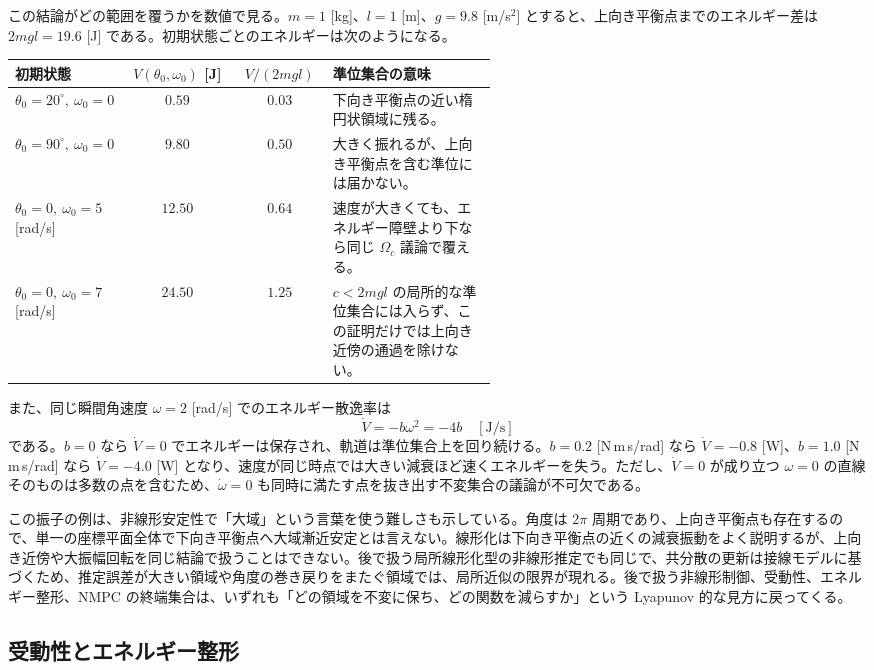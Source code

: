 \begin{example}[粘性減衰をもつ単振子]
この結論がどの範囲を覆うかを数値で見る。$m=1$ [kg]、$l=1$ [m]、$g=9.8$ [m/s$^2$] とすると、上向き平衡点までのエネルギー差は $2mgl=19.6$ [J] である。初期状態ごとのエネルギーは次のようになる。
\begin{center}
\begin{tabular}{p{0.22\linewidth}|c|c|p{0.34\linewidth}}
初期状態 & $V(\theta_0,\omega_0)$ [J] & $V/(2mgl)$ & 準位集合の意味\\ \hline
$\theta_0=20^\circ,\ \omega_0=0$ & $0.59$ & $0.03$ & 下向き平衡点の近い楕円状領域に残る。\\
$\theta_0=90^\circ,\ \omega_0=0$ & $9.80$ & $0.50$ & 大きく振れるが、上向き平衡点を含む準位には届かない。\\
$\theta_0=0,\ \omega_0=5$ [rad/s] & $12.50$ & $0.64$ & 速度が大きくても、エネルギー障壁より下なら同じ $\Omega_c$ 議論で覆える。\\
$\theta_0=0,\ \omega_0=7$ [rad/s] & $24.50$ & $1.25$ & $c<2mgl$ の局所的な準位集合には入らず、この証明だけでは上向き近傍の通過を除けない。\\
\end{tabular}
\end{center}
また、同じ瞬間角速度 $\omega=2$ [rad/s] でのエネルギー散逸率は
\begin{equation}
  \dot{V}=-b\omega^2=-4b\quad[\mathrm{J/s}]
\end{equation}
である。$b=0$ なら $\dot{V}=0$ でエネルギーは保存され、軌道は準位集合上を回り続ける。$b=0.2$ [N\,m\,s/rad] なら $\dot{V}=-0.8$ [W]、$b=1.0$ [N\,m\,s/rad] なら $\dot{V}=-4.0$ [W] となり、速度が同じ時点では大きい減衰ほど速くエネルギーを失う。ただし、$\dot{V}=0$ が成り立つ $\omega=0$ の直線そのものは多数の点を含むため、$\dot{\omega}=0$ も同時に満たす点を抜き出す不変集合の議論が不可欠である。
\end{example}

この振子の例は、非線形安定性で「大域」という言葉を使う難しさも示している。角度は $2\pi$ 周期であり、上向き平衡点も存在するので、単一の座標平面全体で下向き平衡点へ大域漸近安定とは言えない。線形化は下向き平衡点の近くの減衰振動をよく説明するが、上向き近傍や大振幅回転を同じ結論で扱うことはできない。後で扱う局所線形化型の非線形推定でも同じで、共分散の更新は接線モデルに基づくため、推定誤差が大きい領域や角度の巻き戻りをまたぐ領域では、局所近似の限界が現れる。後で扱う非線形制御、受動性、エネルギー整形、NMPC の終端集合は、いずれも「どの領域を不変に保ち、どの関数を減らすか」という Lyapunov 的な見方に戻ってくる。

\subsection{受動性とエネルギー整形}

